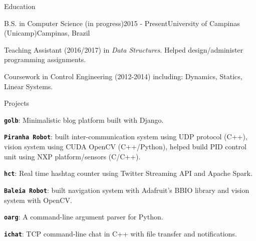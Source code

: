 \documentclass[8pt]{resume}
\newcommand{\tit}[1]{\textit{#1}}
\newcommand{\tbf}[1]{\textbf{#1}}
\newcommand{\ttt}[1]{\texttt{#1}}
\begin{document}
\begin{rSection}{Education}

    \begin{rSubsection}{B.S. in Computer Science (in progress)}{2015 - Present}{University of Campinas (Unicamp)}{Campinas, Brazil}
    \item Teaching Assistant (2016/2017) in \tit{Data Structures}. Helped
        design/administer programming assignments.
    \item Coursework in Control Engineering (2012-2014) including:
        Dynamics, Statics, Linear Systems.
\end{rSubsection}

\end{rSection}

\begin{rSection}{Projects}
\begin{rSubsection}{}{}{}{}
    \vspace{-0.5em}
    \item \tbf{\ttt{golb}}: Minimalistic blog platform built with Django.
    \item \tbf{\ttt{Piranha Robot}}:
        built inter-communication system using UDP protocol (C++),
        vision system using CUDA OpenCV (C++/Python),
        helped build PID control unit using NXP platform/sensors (C/C++).
    \item \tbf{\ttt{hct}}: Real time hashtag counter using Twitter Streaming API and
        Apache Spark.
    \item \tbf{\ttt{Baleia Robot}}:
        built navigation system with Adafruit's BBIO library and
        vision system with OpenCV.
    \item \tbf{\ttt{oarg}}: A command-line argument parser for Python.
    \item \tbf{\ttt{ichat}}: TCP command-line chat in C++ with file transfer and
        notifications.
\end{rSubsection}

\end{rSection}
\end{document}
